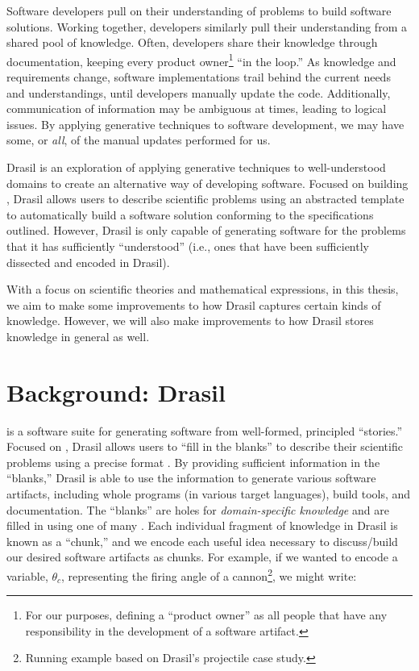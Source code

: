Software developers pull on their understanding of problems to build software
solutions. Working together, developers similarly pull their understanding from
a shared pool of knowledge. Often, developers share their knowledge through
documentation, keeping every product owner\footnote{For our purposes, defining a
      ``product owner'' as all people that have any responsibility in the development
      of a software artifact.} ``in the loop.'' As knowledge and requirements change,
software implementations trail behind the current needs and understandings,
until developers manually update the code. Additionally, communication of
information may be ambiguous at times, leading to logical issues. By applying
generative techniques to software development, we may have some, or
\textit{all}, of the manual updates performed for us.

Drasil \cite{Drasil2021} is an exploration of applying generative techniques to
well-understood domains to create an alternative way of developing software.
Focused on building , Drasil allows users to describe scientific
problems using an abstracted  template to automatically build a
software solution conforming to the specifications outlined. However, Drasil is
only capable of generating software for the problems that it has sufficiently
``understood'' (i.e., ones that have been sufficiently dissected and encoded in
Drasil).

With a focus on scientific theories and mathematical expressions, in this
thesis, we aim to make some improvements to how Drasil captures certain kinds of
knowledge. However, we will also make improvements to how Drasil stores
knowledge in general as well.

\section{Background: Drasil}
\label{chap:introduction:sec:background}

 is a software suite
for generating software from well-formed, principled ``stories.'' Focused on
, Drasil allows users to ``fill in the blanks'' to describe their
scientific problems using a precise  format \cite{SmithAndLai2005}. By
providing sufficient information in the ``blanks,'' Drasil is able to use the
information to generate various software artifacts, including whole programs (in
various target languages), build tools, and documentation. The ``blanks'' are
holes for \textit{domain-specific knowledge} and are filled in using one of many
. Each individual fragment of knowledge in Drasil is known as a
``chunk,'' and we encode each useful idea necessary to discuss/build our desired
software artifacts as chunks. For example, if we wanted to encode a variable,
\(\theta{}_{c}\), representing the firing angle of a cannon\footnote{Running
      example based on Drasil's \acs{projectile} case study.}, we might write:

